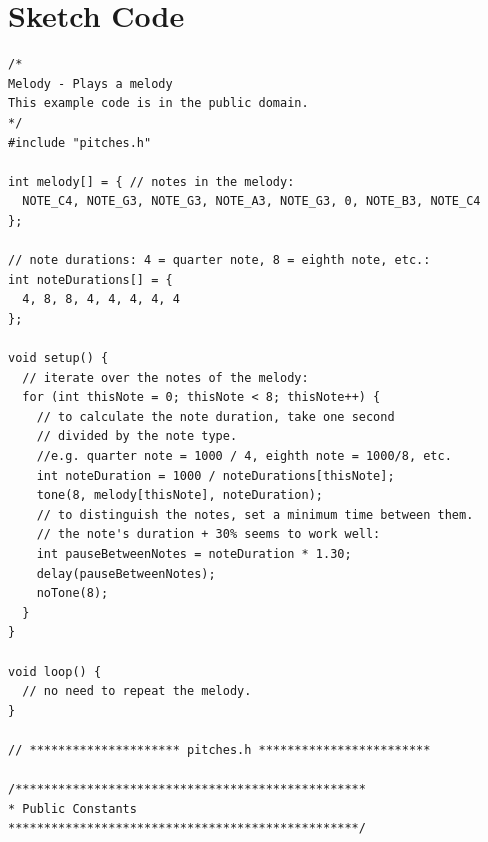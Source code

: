 \section*{Sketch Code}
\label{sketch:exp3}
\begin{lstlisting}
/*
Melody - Plays a melody
This example code is in the public domain.
*/
#include "pitches.h"

int melody[] = { // notes in the melody:
  NOTE_C4, NOTE_G3, NOTE_G3, NOTE_A3, NOTE_G3, 0, NOTE_B3, NOTE_C4
};

// note durations: 4 = quarter note, 8 = eighth note, etc.:
int noteDurations[] = {
  4, 8, 8, 4, 4, 4, 4, 4
};

void setup() {
  // iterate over the notes of the melody:
  for (int thisNote = 0; thisNote < 8; thisNote++) {
    // to calculate the note duration, take one second
    // divided by the note type.
    //e.g. quarter note = 1000 / 4, eighth note = 1000/8, etc.
    int noteDuration = 1000 / noteDurations[thisNote];
    tone(8, melody[thisNote], noteDuration);
    // to distinguish the notes, set a minimum time between them.
    // the note's duration + 30% seems to work well:
    int pauseBetweenNotes = noteDuration * 1.30;
    delay(pauseBetweenNotes);
    noTone(8);
  }
}

void loop() {
  // no need to repeat the melody.
}

// ********************* pitches.h ************************

/*************************************************
* Public Constants
*************************************************/


\end{lstlisting}
